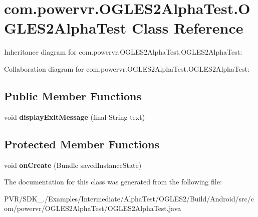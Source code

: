 \hypertarget{classcom_1_1powervr_1_1_o_g_l_e_s2_alpha_test_1_1_o_g_l_e_s2_alpha_test}{\section{com.\+powervr.\+O\+G\+L\+E\+S2\+Alpha\+Test.\+O\+G\+L\+E\+S2\+Alpha\+Test Class Reference}
\label{classcom_1_1powervr_1_1_o_g_l_e_s2_alpha_test_1_1_o_g_l_e_s2_alpha_test}
}


Inheritance diagram for com.\+powervr.\+O\+G\+L\+E\+S2\+Alpha\+Test.\+O\+G\+L\+E\+S2\+Alpha\+Test\+:


Collaboration diagram for com.\+powervr.\+O\+G\+L\+E\+S2\+Alpha\+Test.\+O\+G\+L\+E\+S2\+Alpha\+Test\+:
\subsection*{Public Member Functions}
\begin{DoxyCompactItemize}
\item 
\hypertarget{classcom_1_1powervr_1_1_o_g_l_e_s2_alpha_test_1_1_o_g_l_e_s2_alpha_test_ae9f82f25ead5cb7da95fe7b21805f27b}{void {\bfseries display\+Exit\+Message} (final String text)}\label{classcom_1_1powervr_1_1_o_g_l_e_s2_alpha_test_1_1_o_g_l_e_s2_alpha_test_ae9f82f25ead5cb7da95fe7b21805f27b}

\end{DoxyCompactItemize}
\subsection*{Protected Member Functions}
\begin{DoxyCompactItemize}
\item 
\hypertarget{classcom_1_1powervr_1_1_o_g_l_e_s2_alpha_test_1_1_o_g_l_e_s2_alpha_test_af7226892374a437912896505165c5353}{void {\bfseries on\+Create} (Bundle saved\+Instance\+State)}\label{classcom_1_1powervr_1_1_o_g_l_e_s2_alpha_test_1_1_o_g_l_e_s2_alpha_test_af7226892374a437912896505165c5353}

\end{DoxyCompactItemize}


The documentation for this class was generated from the following file\+:\begin{DoxyCompactItemize}
\item 
P\+V\+R/\+S\+D\+K\+\_./\+Examples/\+Intermediate/\+Alpha\+Test/\+O\+G\+L\+E\+S2/\+Build/\+Android/src/com/powervr/\+O\+G\+L\+E\+S2\+Alpha\+Test/O\+G\+L\+E\+S2\+Alpha\+Test.\+java\end{DoxyCompactItemize}
